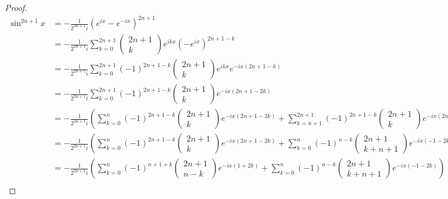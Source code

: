 \documentclass[a4paper,10pt]{article}
\begin{document}
\begin{proof}
\begin{align*}
  \sin^{2n + 1} x & = -\frac{1}{2^{2n + 1}i}(e^{ix} - e^{-ix})^{2n + 1}\\
  & = -\frac{1}{2^{2n + 1}i} \sum_{k = 0}^{2n + 1} \begin{pmatrix}2n + 1\\k\end{pmatrix} e^{ikx}(-e^{ix})^{2n + 1 - k}\\
  & = -\frac{1}{2^{2n + 1}i} \sum_{k = 0}^{2n + 1} (-1)^{2n + 1 - k} \begin{pmatrix}2n + 1\\k\end{pmatrix} e^{ikx}e^{-ix(2n + 1 - k)}\\
  & = -\frac{1}{2^{2n + 1}i} \sum_{k = 0}^{2n + 1} (-1)^{2n + 1 - k} \begin{pmatrix}2n + 1\\k\end{pmatrix} e^{-ix(2n + 1 - 2k)}\\
  & = -\frac{1}{2^{2n + 1}i} \left(\sum_{k = 0}^{n} (-1)^{2n + 1 - k} \begin{pmatrix}2n + 1\\k\end{pmatrix} e^{-ix(2n + 1 - 2k)} + \sum_{k = n + 1}^{2n + 1} (-1)^{2n + 1 - k} \begin{pmatrix}2n + 1\\k\end{pmatrix} e^{-ix(2n + 1 - 2k)}\right)\\
  & = -\frac{1}{2^{2n + 1}i} \left(\sum_{k = 0}^{n} (-1)^{2n + 1 - k} \begin{pmatrix}2n + 1\\k\end{pmatrix} e^{-ix(2n + 1 - 2k)} + \sum_{k = 0}^{n} (-1)^{n - k} \begin{pmatrix}2n + 1\\k + n + 1\end{pmatrix} e^{-ix(-1 - 2k)}\right)\\
  & = -\frac{1}{2^{2n + 1}i} \left(\sum_{k = 0}^{n} (-1)^{n + 1 + k} \begin{pmatrix}2n + 1\\n - k\end{pmatrix} e^{-ix(1 + 2k)} + \sum_{k = 0}^{n} (-1)^{n - k} \begin{pmatrix}2n + 1\\k + n + 1\end{pmatrix} e^{-ix(-1 - 2k)}\right)\\

\end{align*}
\end{proof}
\end{document}
